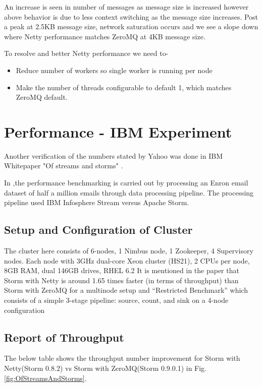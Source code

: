 \documentclass[9pt,twocolumn,twoside]{styles/osajnl}
\newcommand{\TODO}[2][]{\todo[color=red!10,inline,#1]{#2}}
\begin{document}
An increase is seen in number of messages as message size is increased
however above behavior is due to less context switching as the message
size increases. Post a peak at 2.5KB message size, network saturation
occurs and we see a slope down where Netty performance matches ZeroMQ
at 4KB message size.

To resolve and better Netty performance we need to-
\begin{itemize}
	\renewcommand{\labelitemi}{\scriptsize$\square$} 
	\item Reduce number of workers so single worker is running per
          node
        \item Make the number of threads configurable to default 1,
          which matches ZeroMQ default.
\end{itemize}

\section{Performance - IBM Experiment}
Another verification of the numbers stated by Yahoo was done in IBM
Whitepaper "Of streams and storms" \cite{article-nabi2014streams}.

In \cite{article-nabi2014streams},the performance benchmarking is
carried out by processing an Enron email dataset of half a million
emails through data processing pipeline. The processing pipeline used
IBM Infosphere Stream versus Apache Storm.
\TODO{
Full-stop missing. 
}
\subsection{Setup and Configuration of Cluster}
The cluster here consists of 6-nodes, 1 Nimbus node, 1 Zookeeper, 4
Supervisory nodes. Each node with 3GHz dual-core Xeon cluster (HS21),
2 CPUs per node, 8GB RAM, dual 146GB drives, RHEL 6.2 It is mentioned
in the paper that Storm with Netty is around 1.65 times faster (in
terms of throughput) than Storm with ZeroMQ for a multinode setup and
“Restricted Benchmark” which consists of a simple 3-stage pipeline:
source, count, and sink on a 4-node configuration

\subsection{Report of Throughput}
The below table shows the throughput number improvement for Storm with
Netty(Storm 0.8.2) vs Storm with ZeroMQ(Storm 0.9.0.1) in
Fig. \ref{fig:OfStreamsAndStorms}.
\end{document}
